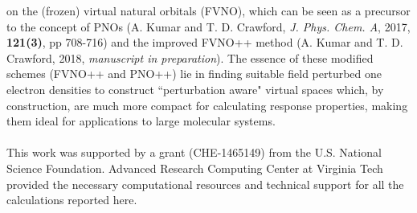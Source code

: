 \documentclass[12pt]{report}
\begin{document}
on the (frozen) virtual natural orbitals (FVNO), which can be seen as a precursor to the concept 
of PNOs (A. Kumar and T. D. Crawford, {\em J. Phys. Chem. A}, 2017, {\bf 121(3)}, pp 708-716) and 
the improved FVNO++ method (A. Kumar and T. D. Crawford, 2018, {\em manuscript in 
preparation}). The essence of these modified schemes (FVNO++ and PNO++) lie in finding suitable 
field perturbed one electron densities to construct ``perturbation aware" virtual spaces which,
by construction, are much more compact for calculating response properties, making them ideal
for applications to large molecular systems. \\\\
\vfill
This work was supported by a grant (CHE-1465149) from
the U.S. National Science Foundation. Advanced Research Computing 
Center at Virginia Tech provided the necessary computational resources and technical 
support for all the calculations reported here.

\pagebreak


\tableofcontents
\pagebreak

\listoffigures
\pagebreak

\listoftables
\pagebreak

\pagestyle{myheadings}

\def\ket#1{| #1 \rangle}
\def\bra#1{\langle #1 |}
\def\bm#1{\mbox{\boldmath $#1$}}
\def\degrees{deg dm$^{-1}$ (g/mL)$^{-1}$}
\def\optrot{$[\alpha]$}
\def\crt#1{a_{#1}^{\dagger}}
\def\ann#1{a_{#1}^{\ }}
\def\cgs{($10^{-40}$ cgs)}
\end{document}
